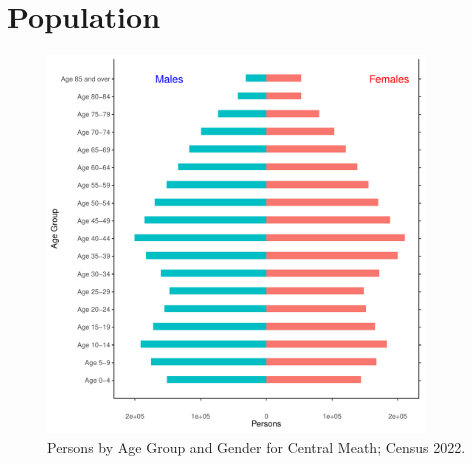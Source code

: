 \documentclass{article}
\begin{document}
\pagebreak

\section{Population} 
\label{sect:Pop}

\begin{figure}[h]
	\centering
	\includegraphics[width = 100mm]{../figures/PyramidPlot.pdf}
	\caption{Persons by Age Group and Gender for Central Meath; Census 2022.}
	\label{fig:2ae19629-1a6a-13a3-e055-000000000001}
	\end{figure}
\end{document}
